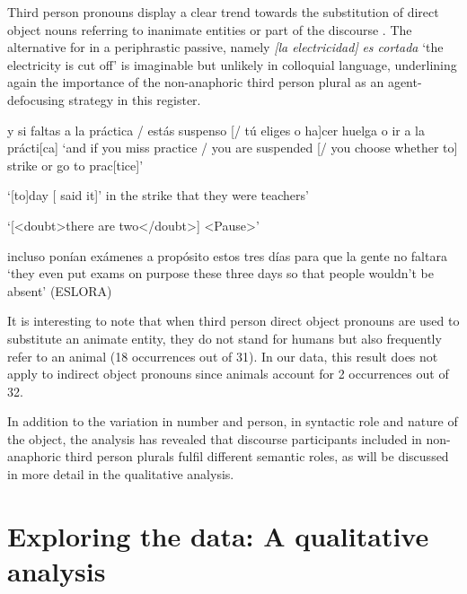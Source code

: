 \documentclass[output=paper]{langscibook}
\begin{document}
Third person pronouns display a clear trend towards the substitution of direct object nouns referring to inanimate entities  or part of the discourse . The alternative for  in a periphrastic passive, namely \textit{[la electricidad]} \textit{es cortada} ‘the electricity is cut off’ is imaginable but unlikely in colloquial language, underlining again the importance of the non-anaphoric third person plural as an agent-defocusing strategy in this register.

\ea\label{ex:pierre:10}
\begin{xlist}[Speaker 2]
 y si faltas a la práctica / estás suspenso [/ tú eliges o ha]cer huelga o ir a la prácti[ca]
 ‘and if you miss practice / you are suspended [/ you choose whether to] strike or go to prac[tice]’

 ‘[to]day [{  } said it]’ in the strike that they were teachers’

 `[<doubt>there are two</doubt>] <Pause>’

 incluso ponían exámenes a propósito estos tres días para que la gente no faltara
 ‘they even put exams on purpose these three days so that people wouldn't be absent’ (ESLORA)
\end{xlist}
\z 


It is interesting to note that when third person direct object pronouns are used to substitute an animate entity, they do not stand for humans but also frequently refer to an animal (18 occurrences out of 31). In our data, this result does not apply to indirect object pronouns since animals account for 2 occurrences out of 32. 


In addition to the variation in number and person, in syntactic role and nature of the object, the analysis has revealed that discourse participants included in non-anaphoric third person plurals fulfil different semantic roles, as will be discussed in more detail in the qualitative analysis.

\section{Exploring the data: A qualitative analysis}\label{sec:pierre:4}
\end{document}
